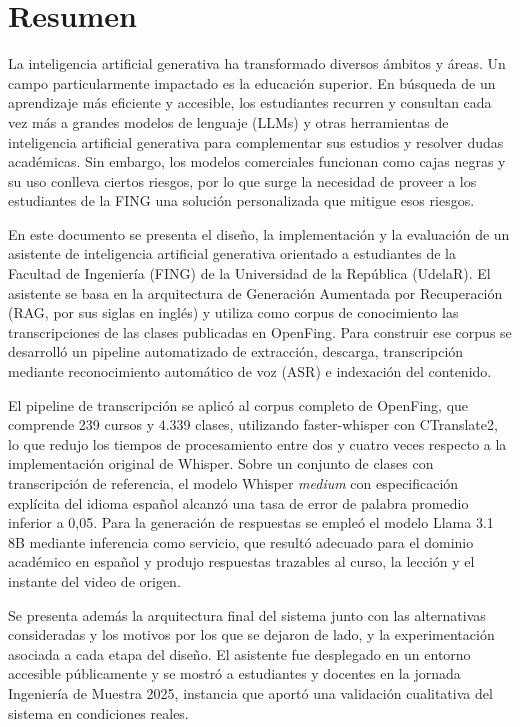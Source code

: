 
\chapter*{Resumen}
\label{chapter:0-Resumen}

La inteligencia artificial generativa ha transformado diversos ámbitos y áreas. Un campo particularmente impactado es la educación superior. En búsqueda de un aprendizaje más eficiente y accesible, los estudiantes recurren y consultan cada vez más a grandes modelos de lenguaje (LLMs) y otras herramientas de inteligencia artificial generativa para complementar sus estudios y resolver dudas académicas. Sin embargo, los modelos comerciales funcionan como cajas negras y su uso conlleva ciertos riesgos, por lo que surge la necesidad de proveer a los estudiantes de la FING una solución personalizada que mitigue esos riesgos.

En este documento se presenta el diseño, la implementación y la evaluación de un asistente de inteligencia artificial generativa orientado a estudiantes de la Facultad de Ingeniería (FING) de la Universidad de la República (UdelaR). El asistente se basa en la arquitectura de Generación Aumentada por Recuperación (RAG, por sus siglas en inglés) y utiliza como corpus de conocimiento las transcripciones de las clases publicadas en OpenFing. Para construir ese corpus se desarrolló un pipeline automatizado de extracción, descarga, transcripción mediante reconocimiento automático de voz (ASR) e indexación del contenido.

El pipeline de transcripción se aplicó al corpus completo de OpenFing, que comprende 239 cursos y 4.339 clases, utilizando faster-whisper con CTranslate2, lo que redujo los tiempos de procesamiento entre dos y cuatro veces respecto a la implementación original de Whisper. Sobre un conjunto de clases con transcripción de referencia, el modelo Whisper \textit{medium} con especificación explícita del idioma español alcanzó una tasa de error de palabra promedio inferior a 0,05. Para la generación de respuestas se empleó el modelo Llama 3.1 8B mediante inferencia como servicio, que resultó adecuado para el dominio académico en español y produjo respuestas trazables al curso, la lección y el instante del video de origen.

Se presenta además la arquitectura final del sistema junto con las alternativas consideradas y los motivos por los que se dejaron de lado, y la experimentación asociada a cada etapa del diseño. El asistente fue desplegado en un entorno accesible públicamente y se mostró a estudiantes y docentes en la jornada Ingeniería de Muestra 2025, instancia que aportó una validación cualitativa del sistema en condiciones reales.


\hfill \break
{}


